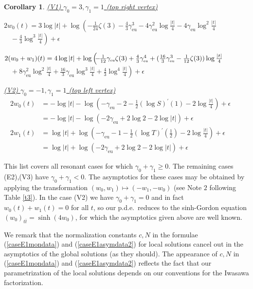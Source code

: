 \documentclass[a4paper,12pt,leqno]{amsart}
\numberwithin{equation}{section}
\theoremstyle{plain}
\newtheorem{corollary}[theorem]{Corollary}
\theoremstyle{definition}
\newcommand{\ga}{\gamma}
\newcommand{\eps}{\epsilon}
\newcommand{\no}{\noindent}
\newcommand{\pr}{\prime}
\newcommand{\ttb}{ {t\bar t}  }
\newcommand{\euler}{\gamma_{\scriptscriptstyle\text{eu}}}
\begin{document}
{\begin{corollary}
\no 
\underline
{\em
(V1) $\ga_0=3, \ga_1=1$ (top right vertex)
}

\no
$
2w_0(t)=  3\log\vert t\vert + \log  
\left(
-\tfrac1{24}\zeta(3)-\tfrac43\euler^3
-4\euler^2\log\tfrac{\vert t\vert}{4}
-4\euler\log^2\tfrac{\vert t\vert}{4}
\right.
$
\newline
$
\left.
\quad -\tfrac43
\log^3\tfrac{\vert t\vert}{4}
\right)
+\eps
$

\no
$
2(w_0+w_1)(t)= 4\log\vert t\vert + 
\log 
\left(
\vphantom{\log\tfrac{\vert t\vert}{4}}
\!\!\!
-\!\!
\tfrac1{12}
\euler\zeta(3) +\tfrac43\euler^4
+(
\tfrac{16}3\euler^3
-\tfrac1{12}\zeta(3) 
)\log\tfrac{\vert t\vert}{4}
\right.
$
\newline
$
\left.
\quad
+8\euler^2\log^2\tfrac{\vert t\vert}{4}
+\tfrac{16}3\euler\log^3\tfrac{\vert t\vert}{4}
+\tfrac43\log^4\tfrac{\vert t\vert}{4}
\right)
+\eps
$

\no 
\underline
{\em
(V2) $\ga_0=-1, \ga_1=1$ (top left vertex)
}
\begin{align*}
2w_0(t)&  = - \log\vert t\vert - \log\left(
- \euler - 2 - \tfrac12 (\log S)^\pr(1) - 2\log\tfrac{\vert t\vert}{4}
\right)
+\eps
\ \ \ \ \ \ \ \
\\
& = - \log\vert t\vert - \log\left(
-2\euler +2\log2 - 2\log\vert t\vert
\right)
+\eps
\\
2w_1(t)& =  \log\vert t\vert + \log\left(
- \euler - 1 - \tfrac12 (\log T)^\pr(\tfrac12) - 2\log\tfrac{\vert t\vert}{4}
\right)
+\eps
\\
& =  \log\vert t\vert + \log\left(
-2\euler +2\log2 - 2\log\vert t\vert
\right)
+\eps
\end{align*}
\end{corollary}

This list covers all resonant cases for which $\ga_0+\ga_1\ge0$. The remaining cases (E2),(V3) have $\ga_0+\ga_1<0$. The asymptotics for these cases may be obtained by applying the transformation $(w_0,w_1)\mapsto(-w_1,-w_0)$ (see Note $2$ following Table \ref{t3}). In the case (V2) we have 
$\ga_0+\ga_1=0$ and in fact
$w_0(t)+w_1(t)=0$ for all $t$, so our p.d.e.\ reduces to the sinh-Gordon equation $(w_0)_{\ttb}= \sinh(4w_0)$, for which the asymptotics given above are well known.

We remark that the normalization constants $c,N$ in the formulae 
(\ref{caseE1mondata}) and  (\ref{caseE1asymdata2})
for local solutions cancel out in the asymptotics of the global solutions (as they should).  The appearance of $c,N$ in (\ref{caseE1mondata}) and (\ref{caseE1asymdata2})  reflects the fact that our parametrization of the local solutions depends on our conventions for the Iwasawa factorization. 

}
\end{document}
